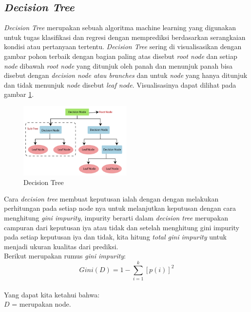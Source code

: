 \subsection{\textit{Decision Tree}} \label{II.decisiontree}
\textit{Decision Tree} merupakan sebuah algoritma machine learning yang digunakan untuk tugas klasifikasi dan regresi dengan memprediksi berdasarkan serangkaian kondisi atau pertanyaan tertentu\cite{song2015decision}. \textit{Decision Tree} sering di visualisasikan dengan gambar pohon terbaik dengan bagian paling atas disebut \textit{root node} dan setiap \textit{node} dibawah \textit{root node} yang ditunjuk oleh panah dan menunjuk panah bisa disebut dengan \textit{decision node atau branches} dan untuk \textit{node} yang hanya ditunjuk dan tidak menunjuk \textit{node} disebut \textit{leaf node}\cite{rojas2012graphical}. Visualisasinya dapat dilihat pada gambar \ref{fig:2.decisiontree}.\\
\begin{figure}[H]
	\centering
	\includegraphics[width=0.5\textwidth]{figure/decision tree.png}
	\caption{Decision Tree}
	\label{fig:2.decisiontree}
\end{figure}
Cara \textit{decision tree} membuat keputusan ialah dengan dengan melakukan perhitungan pada setiap node nya untuk melanjutkan keputusan dengan cara menghitung \textit{gini impurity}, impurity berarti dalam \textit{decision tree} merupakan campuran dari keputusan iya atau tidak dan setelah menghitung gini impurity pada setiap keputusan iya dan tidak, kita hitung \textit{total gini impurity} untuk menjadi ukuran kualitas dari prediksi\cite{suthaharan2016decision}.\\ 
Berikut merupakan rumus \textit{gini impurity}:\\
\begin{equation} 
Gini(D) = 1 - \sum_{i=1}^k [p(i)]^2
\end{equation}
\label{eq:2.gini}
\\
Yang dapat kita ketahui bahwa:\\
$D$ = merupakan node.\\
